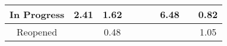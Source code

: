 \begin{tabular}{|c||c|c|c|c|c|c|c|c|}
\hline
In Progress & \cellcolor[rgb]{0.8644820465790697,0.8184388641690329,0.42} 2.41 & \cellcolor[rgb]{0.8900365841145105,0.8305436451068734,0.42} 1.62 &  &  &  & \cellcolor[rgb]{0.7325196670573102,0.7559303686060943,0.42} 6.48 &  & \cellcolor[rgb]{0.8734366608889914,0.6669335282078928,0.38587421682972534} 0.82 \\ 
\hline
Reopened &  & \cellcolor[rgb]{0.8069484710642836,0.3522227630376088,0.32381857299333133} 0.48 &  &  &  &  &  & \cellcolor[rgb]{0.9082468644750253,0.8391695673829067,0.42} 1.05 \\ 
\hline
\end{tabular}